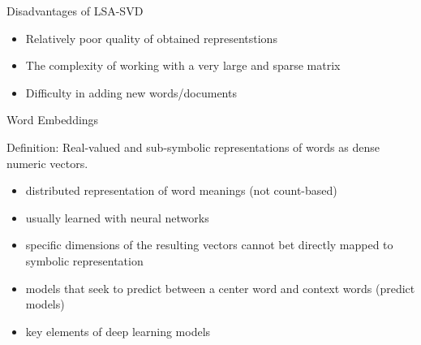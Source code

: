 \documentclass[svgnames]{beamer}
\begin{document}


    \begin{frame}{Disadvantages of LSA-SVD}
        \begin{itemize}
            \item Relatively poor quality of obtained representstions
            \item The complexity of working with a very large and sparse matrix
            \item Difficulty in adding new words/documents
        \end{itemize}
    \end{frame}


    \begin{frame}{Word Embeddings}

        Definition: Real-valued and sub-symbolic representations of words as dense
        numeric vectors.

        \begin{itemize}
            \item distributed representation of word meanings (not
            count-based)
            \item usually learned with neural networks
            \item specific dimensions of the resulting vectors cannot bet directly
            mapped to symbolic representation
            \item models that seek to predict between a center word and
            context words (predict models)
            \item key elements of deep learning models
        \end{itemize}
    \end{frame}
\end{document}
